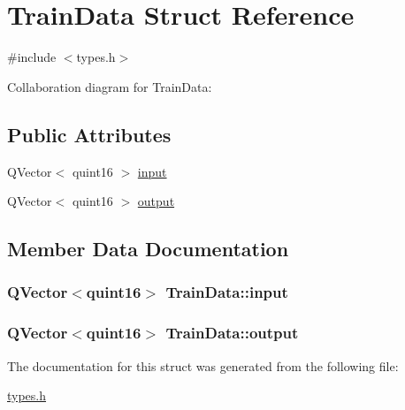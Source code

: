 \hypertarget{structTrainData}{}\section{Train\+Data Struct Reference}
\label{structTrainData}


{\ttfamily \#include $<$types.\+h$>$}



Collaboration diagram for Train\+Data\+:
\subsection*{Public Attributes}
\begin{DoxyCompactItemize}
\item 
Q\+Vector$<$ quint16 $>$ \hyperlink{structTrainData_a1ca54fa933abb059fb0083f7a6267022}{input}
\item 
Q\+Vector$<$ quint16 $>$ \hyperlink{structTrainData_a5d23b2075cf0d65b78a69150898e9d36}{output}
\end{DoxyCompactItemize}


\subsection{Member Data Documentation}
\hypertarget{structTrainData_a1ca54fa933abb059fb0083f7a6267022}{}
\subsubsection[{input}]{\setlength{\rightskip}{0pt plus 5cm}Q\+Vector$<$quint16$>$ Train\+Data\+::input}\label{structTrainData_a1ca54fa933abb059fb0083f7a6267022}
\hypertarget{structTrainData_a5d23b2075cf0d65b78a69150898e9d36}{}
\subsubsection[{output}]{\setlength{\rightskip}{0pt plus 5cm}Q\+Vector$<$quint16$>$ Train\+Data\+::output}\label{structTrainData_a5d23b2075cf0d65b78a69150898e9d36}


The documentation for this struct was generated from the following file\+:\begin{DoxyCompactItemize}
\item 
\hyperlink{types_8h}{types.\+h}\end{DoxyCompactItemize}
